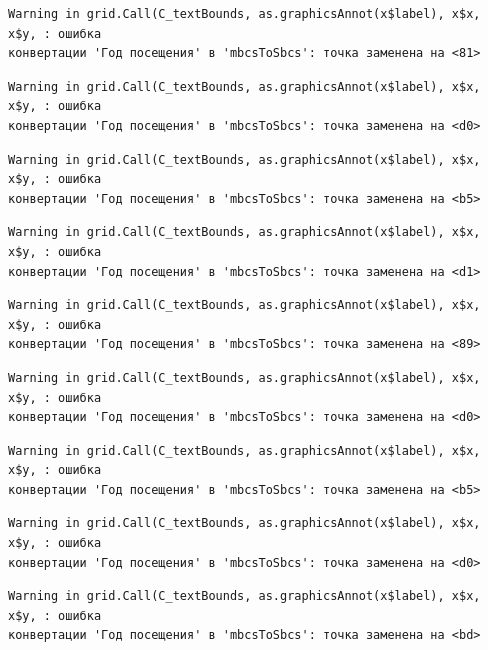 \documentclass[
  letterpaper,
  DIV=11,
  numbers=noendperiod]{scrreprt}
\begin{document}
\begin{verbatim}
Warning in grid.Call(C_textBounds, as.graphicsAnnot(x$label), x$x, x$y, : ошибка
конвертации 'Год посещения' в 'mbcsToSbcs': точка заменена на <81>
\end{verbatim}

\begin{verbatim}
Warning in grid.Call(C_textBounds, as.graphicsAnnot(x$label), x$x, x$y, : ошибка
конвертации 'Год посещения' в 'mbcsToSbcs': точка заменена на <d0>
\end{verbatim}

\begin{verbatim}
Warning in grid.Call(C_textBounds, as.graphicsAnnot(x$label), x$x, x$y, : ошибка
конвертации 'Год посещения' в 'mbcsToSbcs': точка заменена на <b5>
\end{verbatim}

\begin{verbatim}
Warning in grid.Call(C_textBounds, as.graphicsAnnot(x$label), x$x, x$y, : ошибка
конвертации 'Год посещения' в 'mbcsToSbcs': точка заменена на <d1>
\end{verbatim}

\begin{verbatim}
Warning in grid.Call(C_textBounds, as.graphicsAnnot(x$label), x$x, x$y, : ошибка
конвертации 'Год посещения' в 'mbcsToSbcs': точка заменена на <89>
\end{verbatim}

\begin{verbatim}
Warning in grid.Call(C_textBounds, as.graphicsAnnot(x$label), x$x, x$y, : ошибка
конвертации 'Год посещения' в 'mbcsToSbcs': точка заменена на <d0>
\end{verbatim}

\begin{verbatim}
Warning in grid.Call(C_textBounds, as.graphicsAnnot(x$label), x$x, x$y, : ошибка
конвертации 'Год посещения' в 'mbcsToSbcs': точка заменена на <b5>
\end{verbatim}

\begin{verbatim}
Warning in grid.Call(C_textBounds, as.graphicsAnnot(x$label), x$x, x$y, : ошибка
конвертации 'Год посещения' в 'mbcsToSbcs': точка заменена на <d0>
\end{verbatim}

\begin{verbatim}
Warning in grid.Call(C_textBounds, as.graphicsAnnot(x$label), x$x, x$y, : ошибка
конвертации 'Год посещения' в 'mbcsToSbcs': точка заменена на <bd>
\end{verbatim}
\end{document}
